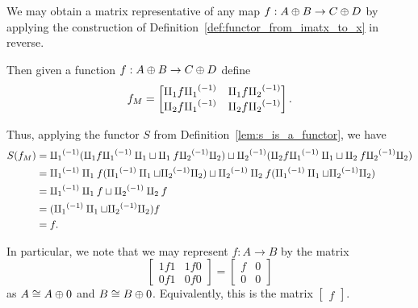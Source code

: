 \begin{example}\label{ex:disjoint_sum_category_maps_are_matrices}
  We may obtain a matrix representative of any map $f:A\oplus B\to C\oplus D$ by applying the construction of
  Definition~\ref{def:functor_from_imatx_to_x} in reverse.

  Then given a function   $f:A\oplus B \to C\oplus D$ define
  \[ f_M =
     \begin{bmatrix}
       \amalg_{1} f {\amalg_{1}}^{(-1)} & \amalg_{1} f {\amalg_{2}}^{(-1)} \\
       \amalg_{2} f {\amalg_{1}}^{(-1)} & \amalg_{2} f {\amalg_{2}}^{(-1)}
      \end{bmatrix}.
  \]

  Thus, applying the functor $S$ from Definition~\ref{lem:s_is_a_functor}, we have
  \begin{align*}
     S(f_M) &= {\amalg_{1}}^{(-1)} (\amalg_{1} f {\amalg_{1}}^{(-1)} \amalg_{1} \sqcup \amalg_{1} f {\amalg_{2}}^{(-1)} \amalg_{2}) \sqcup {\amalg_{2}}^{(-1)}( \amalg_{2} f {\amalg_{1}}^{(-1)}\amalg_{1}
     \sqcup \amalg_{2} f {\amalg_{2}}^{(-1)} \amalg_{2}) \\
     & = {\amalg_{1}}^{(-1)} \amalg_{1} f ({\amalg_{1}}^{(-1)} \amalg_{1} \sqcup {\amalg_{2}}^{(-1)} \amalg_{2}) \sqcup {\amalg_{2}}^{(-1)} \amalg_{2} f ( {\amalg_{1}}^{(-1)} \amalg_{1} \sqcup
     {\amalg_{2}}^{(-1)}\amalg_{2}) \\
     & = {\amalg_{1}}^{(-1)} \amalg_{1} f \sqcup {\amalg_{2}}^{(-1)} \amalg_{2} f \\
     & = ({\amalg_{1}}^{(-1)} \amalg_{1} \sqcup {\amalg_{2}}^{(-1)} \amalg_{2}) f \\
     & = f.
  \end{align*}

In particular, we note that we may represent $f:A\to B$ by the matrix
\[
  \begin{bmatrix}
    1f1& 1f 0 \\ 0 f 1 & 0 f 0
  \end{bmatrix}
  =
  \begin{bmatrix}
    f& 0 \\ 0 & 0
  \end{bmatrix}
\]
as $A \cong A\oplus0$ and $B \cong B\oplus0$. Equivalently, this is the matrix $\begin{bmatrix}f\end{bmatrix}$.
\end{example}


